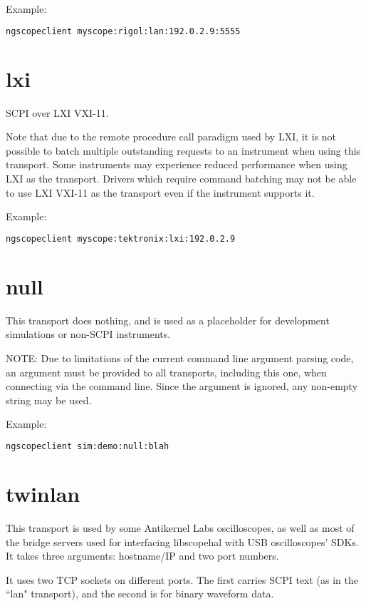 Example:
\begin{lstlisting}[language=sh, numbers=none]
ngscopeclient myscope:rigol:lan:192.0.2.9:5555
\end{lstlisting}

\section{lxi}

SCPI over LXI VXI-11.

Note that due to the remote procedure call paradigm used by LXI, it is not possible to batch multiple outstanding
requests to an instrument when using this transport. Some instruments may experience reduced performance when using LXI
as the transport. Drivers which require command batching may not be able to use LXI VXI-11 as the transport even if the
instrument supports it.

Example:
\begin{lstlisting}[language=sh, numbers=none]
ngscopeclient myscope:tektronix:lxi:192.0.2.9
\end{lstlisting}

\section{null}

This transport does nothing, and is used as a placeholder for development simulations or non-SCPI instruments.

NOTE: Due to limitations of the current command line argument parsing code, an argument must be provided to all
transports, including this one, when connecting via the command line. Since the argument is ignored, any non-empty
string may be used.

Example:
\begin{lstlisting}[language=sh, numbers=none]
ngscopeclient sim:demo:null:blah
\end{lstlisting}

\section{twinlan}

This transport is used by some Antikernel Labs oscilloscopes, as well as most of the bridge servers used for interfacing
libscopehal with USB oscilloscopes' SDKs. It takes three arguments: hostname/IP and two port numbers.

It uses two TCP sockets on different ports. The first carries SCPI text (as in the ``lan" transport), and the second is
for binary waveform data.

